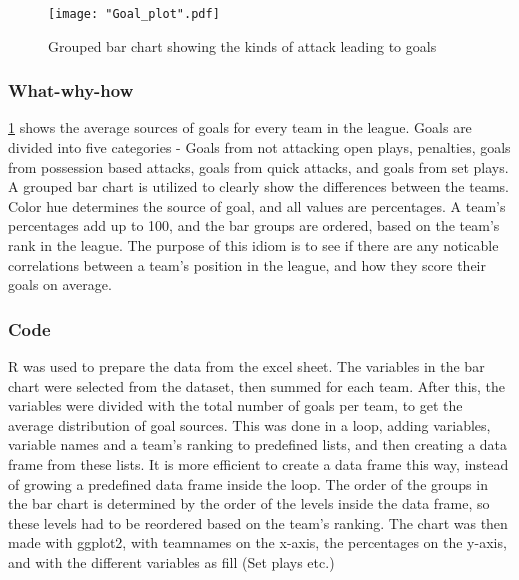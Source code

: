 \documentclass[Report.tex]{subfiles}
\begin{document}
\begin{figure}
\center
\texttt{[image: "Goal\_plot".pdf]}
\caption{Grouped bar chart showing the kinds of attack leading to goals}
\label{Fig:Goal_plot}
\end{figure}

\subsubsection{What-why-how}
\ref{Fig:Goal_plot} shows the average sources of goals for every team in the
league. Goals are divided into five categories - Goals from not attacking open
plays, penalties, goals from possession based attacks, goals from quick attacks,
and goals from set plays. 
A grouped bar chart is utilized to clearly show the differences between the
teams. Color hue determines the source of goal, and all values are
percentages. A team's percentages add up to 100, and the bar groups are ordered,
based on the team's rank in the league. 
The purpose of this idiom is to see if there are any noticable correlations
between a team's position in the league, and how they score their goals on
average. 

\subsubsection{Code}
R was used to prepare the data from the excel sheet. The variables in the bar
chart were selected from the dataset, then summed for each team. After this, the
variables were divided with the total number of goals per team, to get the
average distribution of goal sources. 
This was done in a loop, adding variables, variable names and a team's ranking
to predefined lists, and then creating a data frame from these lists. It is more
efficient to create a data frame this way, instead of growing a predefined data
frame inside the loop. 
The order of the groups in the bar chart is determined by the order of the
levels inside the data frame, so these levels had to be reordered based on the
team's ranking.
The chart was then made with ggplot2, with teamnames on the x-axis, the
percentages on the y-axis, and with the different variables as fill (Set plays
etc.)
\end{document}
